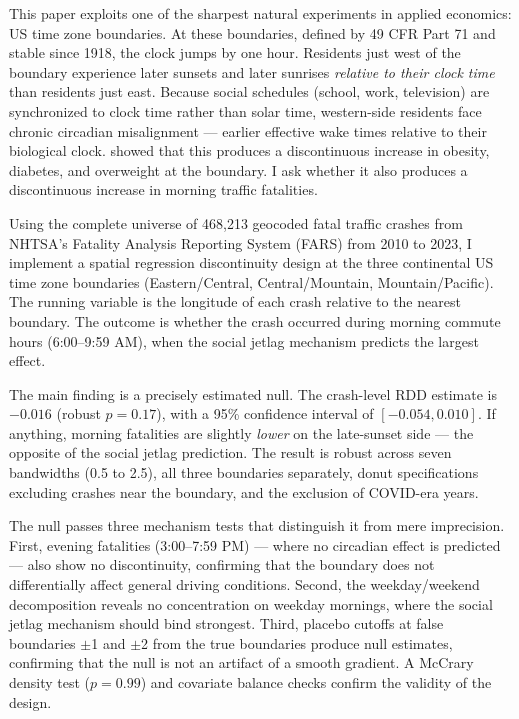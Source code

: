 \documentclass[12pt]{article}
\begin{document}
This paper exploits one of the sharpest natural experiments in applied economics: US time zone boundaries. At these boundaries, defined by 49 CFR Part 71 and stable since 1918, the clock jumps by one hour. Residents just west of the boundary experience later sunsets and later sunrises \textit{relative to their clock time} than residents just east. Because social schedules (school, work, television) are synchronized to clock time rather than solar time, western-side residents face chronic circadian misalignment --- earlier effective wake times relative to their biological clock. \citet{giuntella2019sunset} showed that this produces a discontinuous increase in obesity, diabetes, and overweight at the boundary. I ask whether it also produces a discontinuous increase in morning traffic fatalities.

Using the complete universe of 468,213 geocoded fatal traffic crashes from NHTSA's Fatality Analysis Reporting System (FARS) from 2010 to 2023, I implement a spatial regression discontinuity design at the three continental US time zone boundaries (Eastern/Central, Central/Mountain, Mountain/Pacific). The running variable is the longitude of each crash relative to the nearest boundary. The outcome is whether the crash occurred during morning commute hours (6:00--9:59 AM), when the social jetlag mechanism predicts the largest effect.

The main finding is a precisely estimated null. The crash-level RDD estimate is $-0.016$ (robust $p = 0.17$), with a 95\% confidence interval of $[-0.054, 0.010]$. If anything, morning fatalities are slightly \textit{lower} on the late-sunset side --- the opposite of the social jetlag prediction. The result is robust across seven bandwidths (0.5\textdegree{} to 2.5\textdegree{}), all three boundaries separately, donut specifications excluding crashes near the boundary, and the exclusion of COVID-era years.

The null passes three mechanism tests that distinguish it from mere imprecision. First, evening fatalities (3:00--7:59 PM) --- where no circadian effect is predicted --- also show no discontinuity, confirming that the boundary does not differentially affect general driving conditions. Second, the weekday/weekend decomposition reveals no concentration on weekday mornings, where the social jetlag mechanism should bind strongest. Third, placebo cutoffs at false boundaries $\pm$1\textdegree{} and $\pm$2\textdegree{} from the true boundaries produce null estimates, confirming that the null is not an artifact of a smooth gradient. A McCrary density test ($p = 0.99$) and covariate balance checks confirm the validity of the design.
\end{document}
